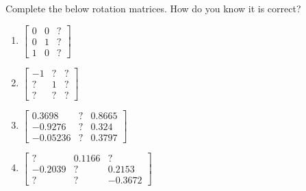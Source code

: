 \documentclass[12pt]{article}
\newenvironment{problem}[2][Problem]{\begin{trivlist}
\item[\hskip \labelsep {\bfseries #1}\hskip \labelsep {\bfseries #2.}]}{\end{trivlist}}
\begin{document}
\begin{problem}{5}%
Complete the below rotation matrices. How do you know it is correct?
\begin{enumerate}[label=(\alph*)]
    \item $\begin{bmatrix}
        0 & 0 & ? \\
        0 & 1 & ? \\
        1 & 0 & ?
        \end{bmatrix} $
    \item $\begin{bmatrix}
        -1 & ? & ? \\
        ? & 1 & ? \\
        ? & ? & ?
        \end{bmatrix} $
    \item $\begin{bmatrix}
        0.3698 & ? & 0.8665 \\
        -0.9276 & ? & 0.324 \\
        -0.05236 & ? & 0.3797
        \end{bmatrix} $
    \item $\begin{bmatrix}
        ? & 0.1166 & ? \\
        -0.2039 & ? & 0.2153 \\
        ? & ? & -0.3672
        \end{bmatrix} $
\end{enumerate}

\end{problem}
\end{document}

